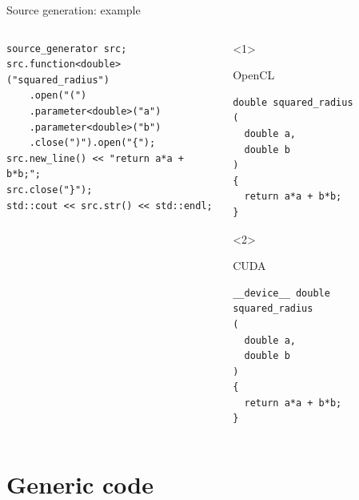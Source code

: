 \documentclass[@BEAMER_OPTIONS@]{beamer}
\begin{document}
\begin{frame}[fragile]{Source generation: example}
    \begin{columns}
        \begin{column}{0.45\textwidth}
            \begin{exampleblock}{}
                \begin{lstlisting}
source_generator src;
src.function<double>("squared_radius")
    .open("(")
    .parameter<double>("a")
    .parameter<double>("b")
    .close(")").open("{");
src.new_line() << "return a*a + b*b;";
src.close("}");
std::cout << src.str() << std::endl;
                \end{lstlisting}
            \end{exampleblock}
        \end{column}
        \begin{column}{0.5\textwidth}
            \begin{onlyenv}<1>
                \begin{exampleblock}{OpenCL}
                    \begin{lstlisting}
double squared_radius
(
  double a,
  double b
)
{
  return a*a + b*b;
}
                    \end{lstlisting}
                \end{exampleblock}
            \end{onlyenv}
            \begin{onlyenv}<2>
                \begin{exampleblock}{CUDA}
                    \begin{lstlisting}
__device__ double squared_radius
(
  double a,
  double b
)
{
  return a*a + b*b;
}
                    \end{lstlisting}
                \end{exampleblock}
            \end{onlyenv}
        \end{column}
    \end{columns}
\end{frame}

\section{Generic code}
\end{document}
